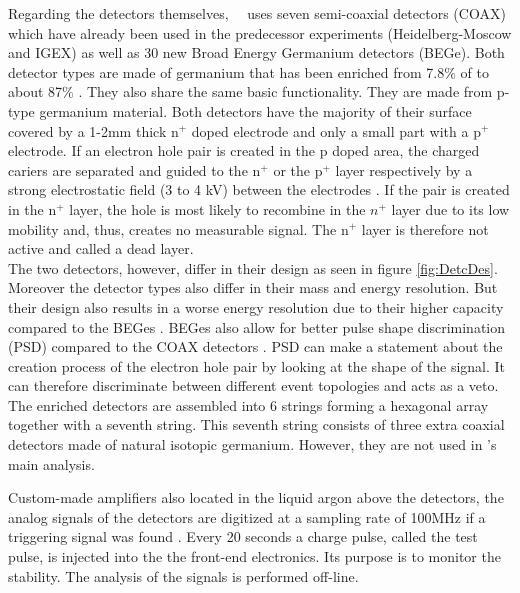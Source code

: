 \documentclass[encoding=utf8,british]{tumphthesis}
\begin{document}
Regarding the detectors themselves, \gerda\ \PII\ uses seven semi-coaxial detectors (COAX) which have already been used in the predecessor experiments (Heidelberg-Moscow and IGEX) as well as 30 new Broad Energy Germanium detectors (BEGe).
Both detector types are made of germanium that has been enriched from 7.8$\%$ of  to about 87$\%$ \cite{agostini_background_2017}.
They also share the same basic functionality.
They are made from p-type germanium material.
Both detectors have the majority of their surface covered by a 1-2mm thick n$^+$ doped electrode and only a small part with a p$^+$ electrode.
If an electron hole pair is created in the p doped area, the charged cariers are separated and guided to the n$^+$ or the p$^+$ layer respectively by a strong electrostatic field (3 to 4 kV) between the electrodes  \cite{spieler_semiconductor_2005}.
If the pair is created in the n$^+$ layer, the hole is most likely to recombine in the $n^+$ layer due to its low mobility and, thus, creates no measurable signal.
The n$^+$ layer is therefore not active and called a dead layer.
\\

The two detectors, however, differ in their design as seen in figure \ref{fig:DetcDes}.
Moreover the detector types also differ in their mass and energy resolution.
But their design also results in a worse energy resolution due to their higher capacity compared to the BEGes \cite{agostini_production_2015}.
BEGes also allow for better pulse shape discrimination (PSD) compared to the COAX detectors \cite{agostini_pulse_2013}.
PSD can make a statement about the creation process of the electron hole pair by looking at the shape of the signal.
It can therefore discriminate between different event topologies and acts as a veto.
\\

The enriched detectors are assembled into 6 strings forming a hexagonal array together with a seventh string.
This seventh string consists of three extra coaxial detectors made of natural isotopic germanium.
However, they are not used in \gerda's main analysis.

Custom-made amplifiers also located in the liquid argon above the detectors, the analog signals of the detectors are digitized at a sampling rate of 100MHz if a triggering signal was found \cite{riboldi_cryogenic_2015}.
Every 20 seconds a charge pulse, called the test pulse, is injected into the the front-end electronics.
Its purpose is to monitor the stability\cite{agostini_background_2017}.
The analysis of the signals is performed off-line.
\end{document}

